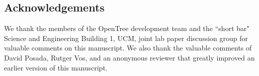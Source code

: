 \documentclass{bmcart}
\begin{document}
\begin{backmatter}
\section*{Acknowledgements}
We thank the members of the OpenTree development team and the ``short bar" Science
and Engineering Building 1, UCM, joint lab paper discussion group for valuable
comments on this manuscript. We also thank the valuable comments of David Posada, Rutger Vos,
and an anonymous reviewer that greatly improved an earlier version of this manuscript.








\end{backmatter}
\end{document}
